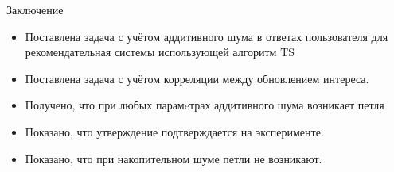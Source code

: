 \documentclass{beamer}
\begin{document}
\begin{frame}{Заключение}
  \begin{itemize}
      \item Поставлена задача с учётом аддитивного шума в ответах пользователя для рекомендательная системы использующей алгоритм TS
      \item Поставлена задача с учётом корреляции между обновлением интереса. 
      \item Получено, что при любых парамeтрах аддитивного шума возникает петля  
      \item Показано, что утверждение подтверждается на эксперименте.
      \item Показано, что при накопительном шуме петли не возникают.
  \end{itemize}
\end{frame}
\end{document}
